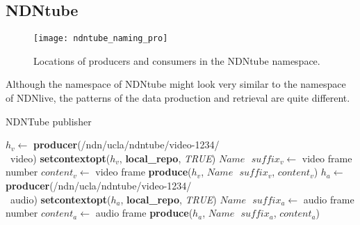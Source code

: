 \subsection{NDNtube}
\begin{figure*}[ht]
  \centering
  \texttt{[image: ndntube\_naming\_pro]}
  \caption{Locations of producers and consumers in the NDNtube namespace.}
  \label{fig:ndntube_cp}
\end{figure*}
Although the namespace of NDNtube might look very similar to the namespace of NDNlive, the patterns of the data production and retrieval are quite different. %

\begin{algorithm}[ht]
\caption{NDNTube publisher}
\label{alg:recordproducer}
\begin{algorithmic}[3]
\State $h_v \leftarrow $ \textbf{producer}(/ndn/ucla/ndntube/video-1234/ \\\ video)
\State \textbf{setcontextopt}($h_v$, \textbf{local\_repo}, \textit{TRUE})
\vspace{0.2cm}
	\State $Name \textbf{ } suffix_v \leftarrow $ video frame number
	\State $content_v \leftarrow $ video frame
	\State \textbf{produce}($h_v$, $Name\textbf{ }suffix_v$, $content_v$)
	\EndWhile
\vspace{0.2cm}
\vspace{0.2cm}
\State $h_a \leftarrow $ \textbf{producer}(/ndn/ucla/ndntube/video-1234/ \\\ audio)
\State \textbf{setcontextopt}($h_a$, \textbf{local\_repo}, \textit{TRUE})
\vspace{0.2cm}
	\State $Name \textbf{ } suffix_a \leftarrow $ audio frame number
	\State $content_a \leftarrow $ audio frame
	\State \textbf{produce}($h_a$, $Name\textbf{ }suffix_a$, $content_a$)
	\EndWhile
\end{algorithmic}
\end{algorithm}

